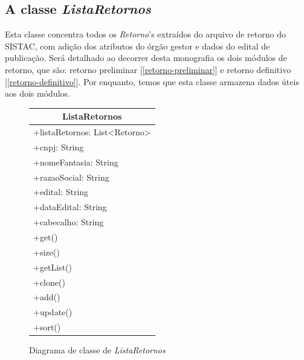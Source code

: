 \documentclass[
	12pt,			%
	openright,		%
	oneside,	
	a4paper,		%
	english,		%
	brazil			%
]{abntex2/abntex2}  %
\begin{document}
			\subsection{A classe \textit{ListaRetornos}}

				Esta classe concentra todos os \textit{Retorno}'s extraídos do arquivo de retorno do SISTAC, com adição dos atributos do órgão gestor e dados do edital de publicação. Será detalhado ao decorrer desta monografia os dois módulos de retorno, que são: retorno preliminar [\ref{retorno-preliminar}] e retorno definitivo [\ref{retorno-definitivo}]. Por enquanto, temos que esta classe armazena dados úteis aos dois módulos.

				\begin{figure}[ht]
					\begin{center}
						
						\caption{Diagrama de classe de \textit{ListaRetornos}}
						
						\begin{tabular}{|l|}
							\hline
							\multicolumn{1}{|c|}{\textbf{ListaRetornos}}         \\ \hline
							+listaRetornos: List\textless{}Retorno\textgreater{} \\
							+cnpj: String                                        \\
							+nomeFantasia: String                                \\
							+razaoSocial: String                                 \\
							+edital: String                                      \\
							+dataEdital: String                                  \\
							+cabecalho: String                                   \\ \hline
							+get()                                               \\
							+size()                                              \\
							+getList()                                           \\
							+clone()                                             \\
							+add()                                               \\
							+update()                                            \\
							+sort()                                              \\ \hline
						\end{tabular}
						
					\end{center}
				\end{figure}
	
\end{document}
